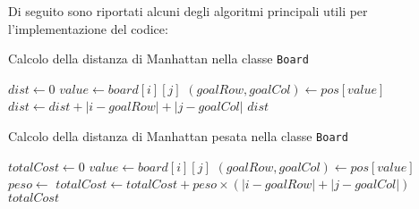 Di seguito sono riportati alcuni degli algoritmi principali utili per l'implementazione del codice: 

\begin{algorithm}[H]
\caption{Calcolo della distanza di Manhattan nella classe \texttt{Board}}
\small
\begin{algorithmic}[1]
    \State $dist \gets 0$
            \State $value \gets board[i][j]$
                \State $(goalRow, goalCol) \gets pos[value]$
                \State $dist \gets dist + |i - goalRow| + |j - goalCol|$
            \EndIf
        \EndFor
    \EndFor
    \State \Return $dist$
\EndFunction
\end{algorithmic}
\end{algorithm}

\begin{algorithm}[H]
\caption{Calcolo della distanza di Manhattan pesata nella classe \texttt{Board}}
\small
\begin{algorithmic}[1]
    \State $totalCost \gets 0$
            \State $value \gets board[i][j]$
                \State $(goalRow, goalCol) \gets pos[value]$
                \State $peso \gets$ 
                \State $totalCost \gets totalCost + peso \times (|i - goalRow| + |j - goalCol|)$
            \EndIf
        \EndFor
    \EndFor
    \State \Return $totalCost$
\EndFunction
\end{algorithmic}
\end{algorithm}

